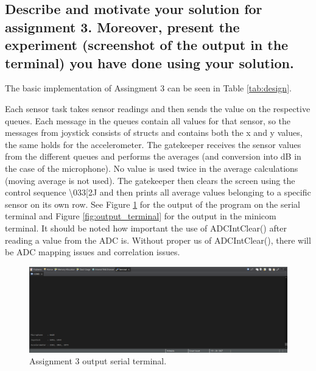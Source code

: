 \subsection{Describe and motivate your solution for assignment 3. Moreover, present the experiment (screenshot of the output in the terminal) you have done using your solution.}
The basic implementation of Assingment 3 can be seen in Table \ref{tab:design}.

\begin{table}[ht]
    \centering
    \caption{Basic design of Assignment 3.}
    \label{tab:design}
\end{table}

Each sensor task takes sensor readings and then sends the value on the respective queues. Each message in the queues contain all values for that sensor, so the messages from joystick consists of structs and contains both the x and y values, the same holds for the accelerometer. The gatekeeper receives the sensor values from the different queues and performs the averages (and conversion into dB in the case of the microphone).  No value is used twice in the average calculations (moving average is not used). The gatekeeper then clears the screen using the control sequence \textbackslash033[2J and then prints all average values belonging to a specific sensor on its own row. See Figure \ref{fig:output} for the output of the program on the serial terminal and Figure \ref{fig:output_terminal} for the output in the minicom terminal. It should be noted how important the use of ADCIntClear() after reading a value from the ADC is. Without proper us of ADCIntClear(), there will be ADC mapping issues and correlation issues.

\begin{figure}[h]
    \centering
    \includegraphics[width=\columnwidth]{images/assignment_3_output.png}
    \caption{Assignment 3 output serial terminal.}
    \label{fig:output}
\end{figure}

